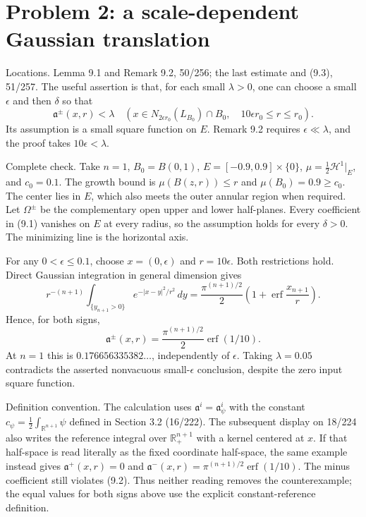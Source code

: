 \documentclass[10pt]{article}
\begin{document}
\section*{Problem 2: a scale-dependent Gaussian translation}
Locations. Lemma 9.1 and Remark 9.2, 50/256; the last estimate and (9.3), 51/257. The useful assertion is that, for each small \(\lambda>0\), one can choose a small \(\epsilon\) and then \(\delta\) so that \[\mathfrak a^\pm(x,r)<\lambda\quad
 (x\in N_{2\epsilon r_0}(L_{B_0})\cap B_0,\quad
 10\epsilon r_0\le r\le r_0).\] Its assumption is a small square function on \(E\). Remark 9.2 requires \(\epsilon\ll\lambda\), and the proof takes \(10\epsilon<\lambda\).\par
Complete check. Take \(n=1\), \(B_0=B(0,1)\), \(E=[-0.9,0.9]\times\{0\}\), \(\mu=\frac12\mathcal H^1|_E\), and \(c_0=0.1\). The growth bound is \(\mu(B(z,r))\le r\) and \(\mu(B_0)=0.9\ge c_0\). The center lies in \(E\), which also meets the outer annular region when required. Let \(\Omega^\pm\) be the complementary open upper and lower half-planes. Every coefficient in (9.1) vanishes on \(E\) at every radius, so the assumption holds for every \(\delta>0\). The minimizing line is the horizontal axis.\par
For any \(0<\epsilon\le0.1\), choose \(x=(0,\epsilon)\) and \(r=10\epsilon\). Both restrictions hold. Direct Gaussian integration in general dimension gives \[r^{-(n+1)}\int_{\{y_{n+1}>0\}}e^{-|x-y|^2/r^2}\,dy
 =\frac{\pi^{(n+1)/2}}2
 \left(1+\operatorname{erf}\frac{x_{n+1}}r\right).\] Hence, for both signs, \[\mathfrak a^\pm(x,r)=\frac{\pi^{(n+1)/2}}2\operatorname{erf}(1/10).\] At \(n=1\) this is \(0.176656335382\ldots\), independently of \(\epsilon\). Taking \(\lambda=0.05\) contradicts the asserted nonvacuous small-\(\epsilon\) conclusion, despite the zero input square function.\par
Definition convention. The calculation uses \(\mathfrak a^i=\mathfrak a_\psi^i\) with the constant \(c_\psi=\frac12\int_{\mathbb R^{n+1}}\psi\) defined in Section 3.2 (16/222). The subsequent display on 18/224 also writes the reference integral over \(\mathbb R^{n+1}_+\) with a kernel centered at \(x\). If that half-space is read literally as the fixed coordinate half-space, the same example instead gives \(\mathfrak a^+(x,r)=0\) and \(\mathfrak a^-(x,r)=\pi^{(n+1)/2}\operatorname{erf}(1/10)\). The minus coefficient still violates (9.2). Thus neither reading removes the counterexample; the equal values for both signs above use the explicit constant-reference definition.\par
\end{document}

